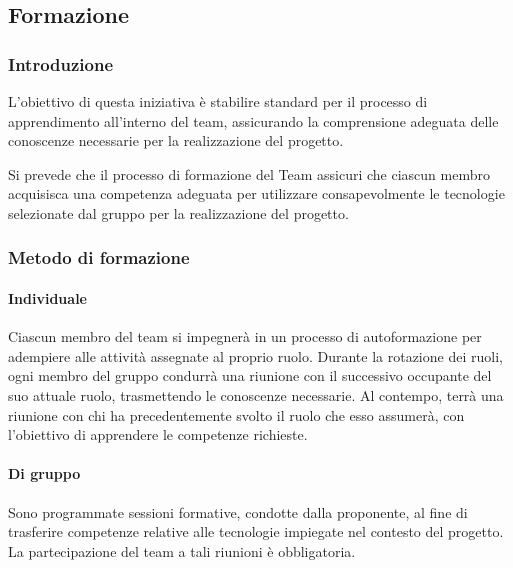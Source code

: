 \subsection{Formazione}
\subsubsection{Introduzione}
L'obiettivo di questa iniziativa è stabilire standard per il processo di apprendimento all'interno del team, assicurando la comprensione adeguata delle conoscenze necessarie per la realizzazione del progetto.

\vspace*{0.1cm}


Si prevede che il processo di formazione del Team assicuri che ciascun membro acquisisca una competenza adeguata per utilizzare consapevolmente le tecnologie selezionate dal gruppo per la realizzazione del progetto.

\subsubsection{Metodo di formazione}
\paragraph{Individuale}
Ciascun membro del team si impegnerà in un processo di autoformazione per adempiere alle attività assegnate al proprio ruolo. Durante la rotazione dei ruoli, ogni membro del gruppo condurrà una riunione con il successivo occupante del suo attuale ruolo, trasmettendo le conoscenze necessarie. Al contempo, terrà una riunione con chi ha precedentemente svolto il ruolo che esso assumerà, con l'obiettivo di apprendere le competenze richieste.

\paragraph{Di gruppo}
Sono programmate sessioni formative, condotte dalla proponente, al fine di trasferire competenze relative alle tecnologie impiegate nel contesto del progetto. La partecipazione del team a tali riunioni è obbligatoria.
